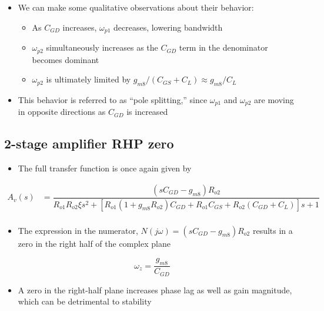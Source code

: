 \documentclass[11pt]{article}
\providecommand{\tightlist}{%
      \setlength{\itemsep}{0pt}\setlength{\parskip}{0pt}}
\begin{document}
\begin{itemize}
\item
  We can make some qualitative observations about their behavior:

  \begin{itemize}
  \tightlist
  \item
    As \(C_{GD}\) increases, \(\omega_{p1}\) decreases, lowering
    bandwidth
  \item
    \(\omega_{p2}\) simultaneously increases as the \(C_{GD}\) term in
    the denominator becomes dominant
  \item
    \(\omega_{p2}\) is ultimately limited by
    \(g_{m8}/(C_{GS} + C_L) \approx g_{m8}/C_L\)
  \end{itemize}
\item
  This behavior is referred to as ``pole splitting,'' since
  \(\omega_{p1}\) and \(\omega_{p2}\) are moving in opposite directions
  as \(C_{GD}\) is increased
\end{itemize}

    \hypertarget{stage-amplifier-rhp-zero}{%
\subsection{2-stage amplifier RHP zero}\label{stage-amplifier-rhp-zero}}

    \begin{itemize}
\tightlist
\item
  The full transfer function is once again given by
\end{itemize}

\begin{align}
A_v(s) &= \dfrac{(sC_{GD} - g_{m8})R_{o2}}{R_{o1} R_{o2}\xi s^2 + [R_{o1}(1+g_{m8}R_{o2})C_{GD} + R_{o1} C_{GS}+R_{o2}(C_{GD} + C_L)]s+1} \\
\end{align}

\begin{itemize}
\tightlist
\item
  The expression in the numerator,
  \(N(j\omega) = (sC_{GD} - g_{m8})R_{o2}\) results in a zero in the
  right half of the complex plane
\end{itemize}

\begin{equation} 
\omega_z = \dfrac{g_{m8}}{C_{GD}}
\end{equation}

\begin{itemize}
\tightlist
\item
  A zero in the right-half plane increases phase lag as well as gain
  magnitude, which can be detrimental to stability
\end{itemize}
\end{document}
